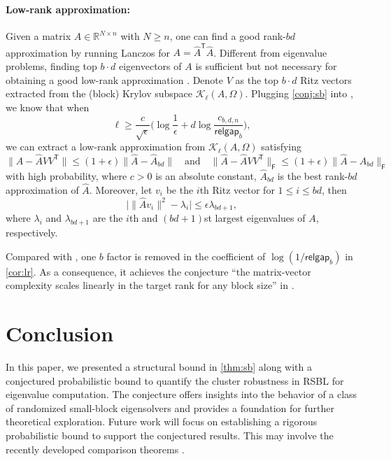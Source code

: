 \documentclass{article}
\newcommand{\Ttran}{\mathsf{T}}
\newcommand{\fro}{\mathsf{F}}
\newcommand{\R}{\mathbb{R}}
\newcommand{\gap}{\mathsf{relgap}}
\providecommand{\norm}[1]{\lVert#1\rVert}
\providecommand{\bigabs}[1]{\bigl\lvert#1\bigr\rvert}
\begin{document}
\paragraph{Low-rank approximation:}
Given a matrix $\widehat{A} \in\R^{N\times n}$ with $N\geq n$, one can find a good rank-$bd$ approximation by running Lanczos for $A=\widehat{A}^{\Ttran}\widehat{A}$. Different from eigenvalue problems, finding top $b\cdot d$ eigenvectors of $A$ is sufficient but not necessary for obtaining a good low-rank approximation \cite{Drineas2019}. 
Denote $V$ as the top $b\cdot d$ Ritz vectors extracted from the (block) Krylov subspace $\mathcal{K}_{\ell}(A,\Omega)$.
Plugging \cref{conj:sb} into \cite[Thm.~3.1]{Meyer2023}, we know that when 
\begin{equation}
    \label{cor:lr}
    \ell \geq  \frac{c}{\sqrt{\epsilon}}\bigl(\log\frac{1}{\epsilon}+d\log\frac{c_{b,d,n}}{\gap_{b}}\bigr),
\end{equation}
we can extract a low-rank approximation from $\mathcal{K}_{\ell}(A,\Omega)$ satisfying
\begin{equation*}
    \norm{\widehat{A}-\widehat{A}VV^{\Ttran}} \leq (1+\epsilon) \norm{\widehat{A}-\widehat{A}_{bd}} 
    \quad \text{and}\quad
    \norm{\widehat{A}-\widehat{A}VV^{\Ttran}}_{\fro} \leq (1+\epsilon) \norm{\widehat{A}-\widehat{A}_{bd}}_{\fro}
\end{equation*}
with high probability, where $c>0$ is an absolute constant, $\widehat{A}_{bd}$ is the best rank-$bd$ approximation of $\widehat{A}$. Moreover, let $v_{i}$ be the $i$th Ritz vector for $1\leq i\leq bd$, then 
\begin{equation*}
    \bigabs{\norm{\widehat{A}v_{i}}^{2}-\lambda_{i}}\leq \epsilon \lambda_{bd+1},
\end{equation*}
where $\lambda_{i}$ and $\lambda_{bd+1}$ are the $i$th and $(bd+1)$st  largest eigenvalues of $A$, respectively.
    
Compared with \cite[Thm.~4.5]{Meyer2023}, one $b$ factor is removed in the coefficient of $\log(1/\gap_{b})$ in \cref{cor:lr}. As a consequence, it achieves the conjecture ``the matrix-vector complexity scales linearly in the target rank for any block size'' in \cite[p.~823]{Meyer2023}.




\section{Conclusion}


In this paper, we presented a structural bound in \cref{thm:sb} along with a conjectured probabilistic bound to quantify the cluster robustness in RSBL for eigenvalue computation. The conjecture offers insights into the behavior of a class of randomized small-block eigensolvers and provides a foundation for further theoretical exploration. Future work will focus on establishing a rigorous probabilistic bound to support the conjectured results. 
This may involve the recently developed comparison theorems \cite{tropp2025comparison,Brailovskaya2024}.
\end{document}
